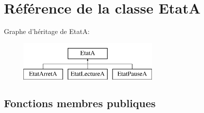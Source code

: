 \hypertarget{classEtatA}{\section{Référence de la classe Etat\+A}
\label{classEtatA}
}
Graphe d'héritage de Etat\+A\+:\begin{figure}[H]
\begin{center}
\leavevmode
\includegraphics[height=2.000000cm]{classEtatA}
\end{center}
\end{figure}
\subsection*{Fonctions membres publiques}
